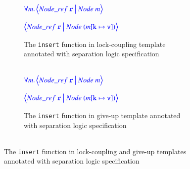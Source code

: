 \documentclass[a4paper,UKenglish,cleveref, autoref, thm-restate]{lipics-v2021}
\newcommand{\treerep}{\ensuremath{\mathsf{Node}}}
\newcommand{\nodeboxrep}{\ensuremath{\mathsf{Node\_ref}}}
\begin{document}
\begin{figure}[!ht]
	\begin{subfigure}{\textwidth}
		$\color{blue}
		\forall m.\left\langle 
		\nodeboxrep\ \texttt{r} \ \big | \ \treerep\ m
		\right\rangle$
		
		$\color{blue}
		\left\langle 
		\nodeboxrep\ \texttt{r} \ \big | \ \treerep\ (m[\texttt{k} \mapsto \texttt{v}])
		\right\rangle$
		\caption{The \texttt{insert} function in lock-coupling template annotated with separation logic specification \\\\}
		\label{proof_lock_insert}	
	\end{subfigure}\qquad
	\begin{subfigure}{\textwidth}
		$\color{blue}
		\forall m.\left\langle 
		\nodeboxrep\ \texttt{r} \ \big | \ \treerep\ m
		\right\rangle$
		
		$\color{blue}
		\left\langle 
		\nodeboxrep\ \texttt{r} \ \big | \ \treerep\ (m[\texttt{k} \mapsto \texttt{v}])
		\right\rangle$
		\caption{The \texttt{insert} function in give-up template annotated with separation logic specification \\\\}
		\label{proof_giveup_insert}
	\end{subfigure}
	\caption{The \texttt{insert} function in lock-coupling and give-up templates annotated with separation logic specification}
	\label{proof_lock_giveup_insert}
\end{figure}
\end{document}
